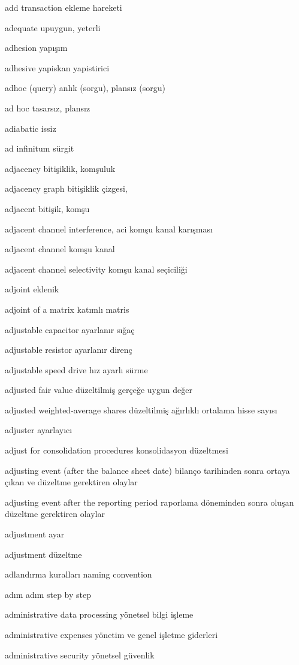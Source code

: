 \documentclass[12pt,fleqn]{article}\usepackage{../../common}
\begin{document}
add transaction ekleme hareketi

adequate upuygun, yeterli

adhesion yapışım

adhesive yapiskan yapistirici

adhoc (query) anlık (sorgu), plansız (sorgu)

ad hoc tasarsız, plansız

adiabatic issiz

ad infinitum sürgit

adjacency bitişiklik, komşuluk

adjacency graph bitişiklik çizgesi,

adjacent bitişik, komşu

adjacent channel interference, aci komşu kanal karışması

adjacent channel komşu kanal

adjacent channel selectivity komşu kanal seçiciliği

adjoint eklenik

adjoint of a matrix katımlı matris

adjustable capacitor ayarlanır sığaç

adjustable resistor ayarlanır direnç

adjustable speed drive hız ayarlı sürme

adjusted fair value düzeltilmiş gerçeğe uygun değer

adjusted weighted-average shares düzeltilmiş ağırlıklı ortalama hisse sayısı

adjuster ayarlayıcı

adjust for consolidation procedures konsolidasyon düzeltmesi

adjusting event (after the balance sheet date) bilanço tarihinden sonra ortaya çıkan ve düzeltme gerektiren olaylar

adjusting event after the reporting period raporlama döneminden sonra oluşan düzeltme gerektiren olaylar

adjustment ayar

adjustment düzeltme

adlandırma kuralları naming convention

adım adım step by step

administrative data processing yönetsel bilgi işleme

administrative expenses yönetim ve genel işletme giderleri

administrative security yönetsel güvenlik
\end{document}

